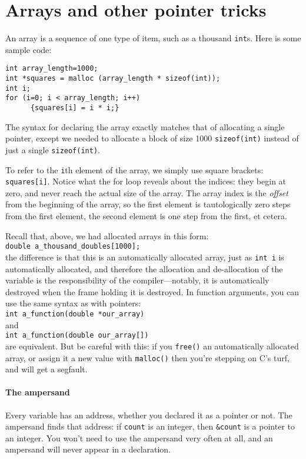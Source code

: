 \documentclass[12pt]{article}
\begin{document}
\section{Arrays and other pointer tricks} \label{for_loops} 

An array is a sequence of one type of item, such as a thousand {\tt int}s. Here is some sample code:
\begin{verbatim}
int array_length=1000;
int *squares = malloc (array_length * sizeof(int));
int i;
for (i=0; i < array_length; i++)
      {squares[i] = i * i;}
\end{verbatim}
The syntax for declaring the array exactly matches that of allocating
a single pointer, except we needed to allocate a block of size 1000
{\tt * sizeof(int)} instead of just a single {\tt sizeof(int)}. 

To refer to the {\tt i}th element of the array, we simply use square
brackets: {\tt squares[i]}. Notice what the for loop reveals about
the indices: they begin at zero, and never reach the actual size of
the array. The array index is the {\sl offset} from the beginning of
the array, so the first element is tautologically zero steps from the first element,
the second element is one step from the first, et cetera. 

Recall that, above, we had allocated arrays in this form:\\
{\tt double a\_thousand\_doubles[1000];}\\
the difference is that this is an automatically allocated array, just
as {\tt int i} is automatically allocated, and therefore
the allocation and de-allocation of the variable is the responsibility
of the compiler---notably, it is automatically destroyed when the frame
holding it is destroyed. In function arguments, you can use the same
syntax as with pointers: 
\\ {\tt int a\_function(double *our\_array)}\\
and
\\ {\tt int a\_function(double our\_array[])}\\
are equivalent.
But be careful with this: if you {\tt free()} an automatically allocated
array, or assign it a new value with {\tt malloc()} then you're stepping
on C's turf, and will get a segfault.

\paragraph{The ampersand}\index{\&} Every variable has an address, whether you
declared it as a pointer or not. The ampersand finds that address: if
{\tt count} is an integer, then {\tt \&count} is a pointer to an integer.
You won't need to use the ampersand very often at all, and 
an ampersand will never appear in a declaration.
\end{document}
